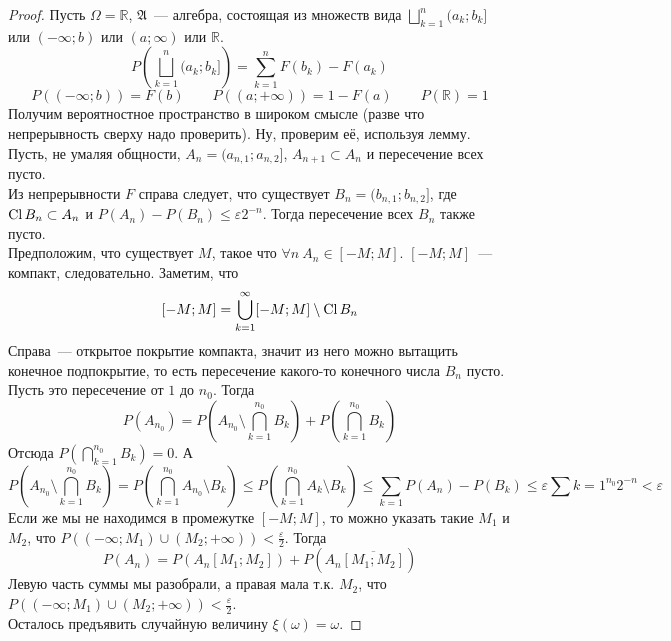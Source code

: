 \documentclass{article}
\let\eps\varepsilon
\newcommand{\A}{{\mathfrak A}}
\begin{document}
    \begin{proof}
        Пусть $\Omega=\mathbb R$, $\A$~--- алгебра, состоящая из множеств вида $\bigsqcup\limits_{k=1}^n(a_k;b_k]$ или $(-\infty;b)$ или $(a;\infty)$ или $\mathbb R$.\\
        $$
        P\left(\bigsqcup\limits_{k=1}^n(a_k;b_k]\right)=\sum\limits_{k=1}^nF(b_k)-F(a_k)
        $$
        $$
        P((-\infty;b))=F(b)\qquad P((a;+\infty))=1-F(a)\qquad P(\mathbb R)=1
        $$
        Получим вероятностное пространство в широком смысле (разве что непрерывность сверху надо проверить). Ну, проверим её, используя лемму. Пусть, не умаляя общности, $A_n=(a_{n,1};a_{n,2}]$, $A_{n+1}\subset A_n$ и пересечение всех пусто.\\
        Из непрерывности $F$ справа следует, что существует $B_n=(b_{n,1};b_{n,2}]$, где $\operatorname{Cl} B_n\subset A_n$ и $P(A_n)-P(B_n)\leqslant\eps 2^{-n}$. Тогда пересечение всех $B_n$ также пусто.\\
        Предположим, что существует $M$, такое что $\forall n~A_n\in[-M;M]$. $[-M;M]$~--- компакт, следовательно. Заметим, что
        $$
        [-M;M]=\bigcup\limits_{k=1}^\infty [-M;M]\setminus\operatorname{Cl} B_n
        $$
        Справа~--- открытое покрытие компакта, значит из него можно вытащить конечное подпокрытие, то есть пересечение какого-то конечного числа $B_n$ пусто. Пусть это пересечение от $1$ до $n_0$. Тогда
        $$
        P(A_{n_0})=P(A_{n_0}\setminus\bigcap\limits_{k=1}^{n_0}B_k)+P\left(\bigcap\limits_{k=1}^{n_0}B_k\right)
        $$
        Отсюда $P\left(\bigcap\limits_{k=1}^{n_0}B_k\right)=0$. А
        $$
        P(A_{n_0}\setminus\bigcap\limits_{k=1}^{n_0}B_k)=P(\bigcap\limits_{k=1}^{n_0}A_{n_0}\setminus B_k)\leqslant P(\bigcap\limits_{k=1}^{n_0}A_k\setminus B_k)\leqslant\sum\limits_{k=1}P(A_n)-P(B_k)\leqslant\eps\sum\limits{k=1}^{n_0} 2^{-n}<\eps
        $$
        Если же мы не находимся в промежутке $[-M;M]$, то можно указать такие $M_1$ и $M_2$, что $P((-\infty;M_1)\cup(M_2;+\infty))<\frac\eps2$. Тогда
        $$
        P(A_n)=P(A_n[M_1;M_2])+P(A_n\overline{[M_1;M_2]})
        $$
        Левую часть суммы мы разобрали, а правая мала т.к. $M_2$, что $P((-\infty;M_1)\cup(M_2;+\infty))<\frac\eps2$.\\
        Осталось предъявить случайную величину $\xi(\omega)=\omega$.
    \end{proof}
\end{document}

